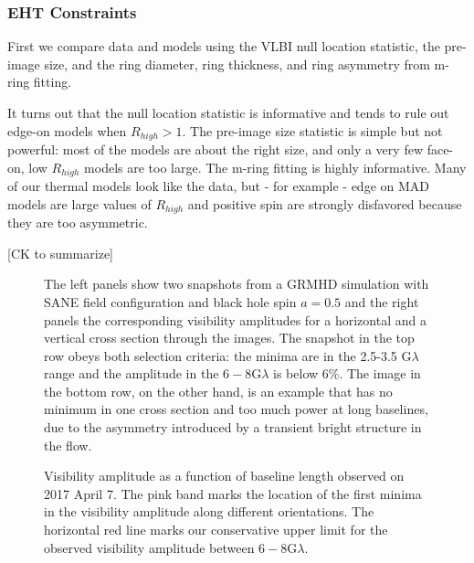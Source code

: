 \subsubsection{EHT Constraints}

First we compare data and models using the VLBI null location statistic, the pre-image size, and the ring diameter, ring thickness, and ring asymmetry from m-ring fitting.

It turns out that the null location statistic is informative and tends to rule out edge-on models when $R_{high} > 1$.  The pre-image size statistic is simple but not powerful: most of the models are about the right size, and only a very few face-on, low $R_{high}$ models are too large.   The m-ring fitting is highly informative.  Many of our thermal models look like the data, but - for example - edge on MAD models are large values of $R_{high}$ and positive spin are strongly disfavored because they are too asymmetric.


[CK to summarize]


\begin{figure*}
  \centering
  [altex]
  \caption{The left panels show two snapshots from a GRMHD simulation
    with SANE field configuration and black hole spin $a=0.5$ and the
    right panels the corresponding visibility amplitudes for a
    horizontal and a vertical cross section through the images.
    The snapshot in the top row obeys both selection criteria: the
    minima are in the 2.5-3.5 G$\lambda$ range and the amplitude in
    the $6-8$G$\lambda$ is below 6\%.
    The image in the bottom row, on the other hand, is an example that
    has no minimum in one cross section and too much power at long
    baselines, due to the asymmetry introduced by a transient bright
    structure in the flow.}
  \label{fig:cmp_VA}
\end{figure*}

\begin{figure}
  \centering
  [altex]
  \caption{Visibility amplitude as a function of baseline length
    observed on 2017 April 7.
    The pink band marks the location of the first minima in the
    visibility amplitude along different orientations.
    The horizontal red line marks our conservative upper limit for the
    observed visibility amplitude between $6-8$G$\lambda$.}
  \label{fig:cmp_null}
\end{figure}

